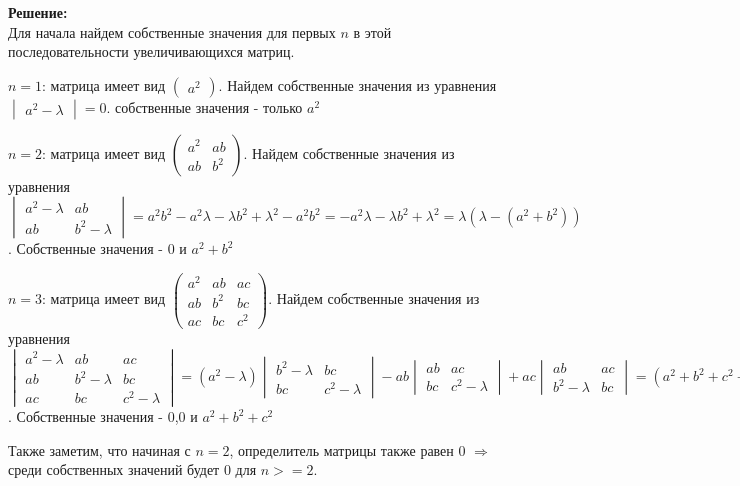\documentclass[a4paper,12pt]{article}
\begin{document}
\begin{enumerate}
\textbf{Решение:}\\
Для начала найдем собственные значения для первых $n$ в этой последовательности увеличивающихся матриц.

$n=1$: матрица имеет вид $
\begin{pmatrix}
a^2
\end{pmatrix}
$. Найдем собственные значения из уравнения $\begin{vmatrix}
a^2-\lambda
\end{vmatrix} =0$. собственные значения - только $a^2$

$n=2$: матрица имеет вид $
\begin{pmatrix}
a^2&ab\\
ab&b^2
\end{pmatrix}
$. Найдем собственные значения из уравнения $\begin{vmatrix}
a^2-\lambda&ab\\
ab&b^2-\lambda
\end{vmatrix} =a^2b^2-a^2\lambda-{\lambda} b^2 + \lambda^2 -a^2b^2=-a^2\lambda-{\lambda} b^2 + \lambda^2=\lambda(\lambda-(a^2+b^2))$. Собственные значения - 0 и $a^2+b^2$

$n=3$: матрица имеет вид $
\begin{pmatrix}
a^2&ab&ac\\
ab&b^2&bc\\
ac&bc&c^2
\end{pmatrix}
$. Найдем собственные значения из уравнения $\begin{vmatrix}
a^2-\lambda&ab&ac\\
ab&b^2-\lambda&bc\\
ac&bc&c^2-\lambda
\end{vmatrix} =(a^2-\lambda)\begin{vmatrix}
b^2-\lambda&bc\\
bc&c^2-\lambda
\end{vmatrix}-ab\begin{vmatrix}
ab&ac\\
bc&c^2-\lambda
\end{vmatrix}+ac\begin{vmatrix}
ab&ac\\
b^2-\lambda&bc
\end{vmatrix}=(a^2 + b^2 + c^2 - \lambda) \lambda^2=0$. Собственные значения - 0,0 и $a^2 + b^2 + c^2$

Также заметим, что начиная с $n=2$, определитель матрицы также равен 0 $\Rightarrow$ среди собственных значений будет 0 для $n>=2$.


\end{enumerate}
\end{document}
